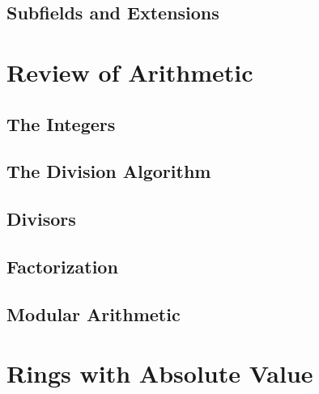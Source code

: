 \documentclass{memoir}
\begin{document}
    \section{Subfields and Extensions}


\setcounter{dummycounter}{\value{section}}%
\appendix
\setcounter{section}{\value{dummycounter}}%

  \chapter{Review of Arithmetic}
    \label{chap:arithmetic}
    
    \newpage

    \section{The Integers}
      \label{sec:the-integers}
      
      \newpage

    \section{The Division Algorithm}
      \label{sec:div-alg}
      
      \newpage

    \section{Divisors}
      \label{sec:int-div}
      
      \newpage

    \section{Factorization}
      \label{sec:int-factor}
      
      \newpage

    \section{Modular Arithmetic}
      \label{sec:int-mod-n}
      

  \chapter{Rings with Absolute Value}
    \label{chap:abs-val}
    
    \newpage
\end{document}
